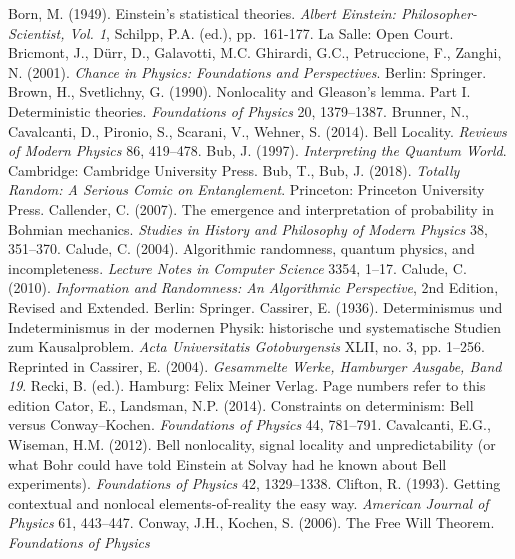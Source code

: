 \documentclass[12pt]{article}
\numberwithin{equation}{section}
\begin{document}
\begin{thebibliography}{99}
  \bibitem{}  Born, M. (1949). Einstein's statistical theories. \emph{Albert Einstein: Philosopher-Scientist, Vol. 1}, 
Schilpp, P.A. (ed.), pp.\ 161-177.  La Salle: Open Court. 
    \bibitem{}  Bricmont, J.,  D\"{u}rr, D.,  Galavotti, M.C.  Ghirardi, G.C.,   Petruccione, F.,   Zanghi, N. (2001).
    \emph{Chance in Physics: Foundations and Perspectives}. Berlin: Springer. 
    \bibitem{} 
Brown, H.,  Svetlichny, G. (1990).
Nonlocality and Gleason's lemma. Part I. Deterministic theories. \emph{Foundations of Physics} 20, 1379--1387.
\bibitem{}   Brunner, N., Cavalcanti, D.,  Pironio, S.,  Scarani, V., Wehner, S. (2014). Bell Locality.  \emph{Reviews of Modern Physics} 86, 419--478.
\bibitem{}
 Bub, J. (1997).  \emph{Interpreting the Quantum World}. Cambridge: Cambridge University Press.
\bibitem{} Bub, T., Bub, J. (2018). \emph{Totally Random: A Serious Comic on Entanglement}. Princeton: Princeton University Press.
\bibitem{} Callender, C. (2007). The emergence and interpretation of probability in
Bohmian mechanics.  \emph{Studies in History and Philosophy of Modern Physics} 38, 351--370. 
\bibitem{}  Calude, C. (2004). Algorithmic randomness, quantum physics, and incompleteness. \emph{Lecture Notes in Computer Science} 3354,  1--17.
\bibitem{}  Calude, C. (2010). \emph{Information and Randomness: An Algorithmic Perspective}, 2nd Edition, Revised and Extended. Berlin: Springer. 
\bibitem{} Cassirer, E. (1936). Determinismus und Indeterminismus in der modernen Physik: historische und systematische Studien zum Kausalproblem. \emph{Acta Universitatis Gotoburgensis} XLII, no. 3, pp. 1--256. Reprinted in Cassirer, E. (2004).
\emph{Gesammelte Werke, Hamburger Ausgabe, Band 19}. Recki, B. (ed.). Hamburg: 
Felix Meiner Verlag.  Page numbers refer to this edition
  \bibitem{}
  Cator, E.,  Landsman, N.P. (2014). Constraints on determinism: Bell versus Conway--Kochen.
  \emph{Foundations of Physics} 44, 781--791. 
  \bibitem{}  Cavalcanti, E.G.,  Wiseman, H.M. (2012). Bell nonlocality, signal locality and unpredictability (or what Bohr could have told Einstein at Solvay had he known about Bell experiments).
   \emph{Foundations of Physics} 42, 1329--1338.
   \bibitem{}
 Clifton, R. (1993).
 Getting contextual and nonlocal elements-of-reality the easy way. \emph{American Journal of Physics}
 61, 443--447.
   \bibitem{}
 Conway, J.H., Kochen, S. (2006). The Free Will Theorem. \emph{Foundations of Physics}

\end{thebibliography}
\end{document}
